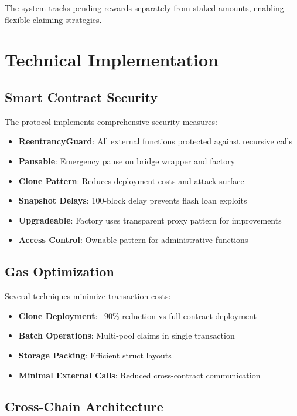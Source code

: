 \documentclass{article}
\begin{document}
The system tracks pending rewards separately from staked amounts, enabling flexible claiming strategies.

\section{Technical Implementation}

\subsection{Smart Contract Security}

The protocol implements comprehensive security measures:

\begin{itemize}
    \item \textbf{ReentrancyGuard}: All external functions protected against recursive calls
    \item \textbf{Pausable}: Emergency pause on bridge wrapper and factory
    \item \textbf{Clone Pattern}: Reduces deployment costs and attack surface
    \item \textbf{Snapshot Delays}: 100-block delay prevents flash loan exploits
    \item \textbf{Upgradeable}: Factory uses transparent proxy pattern for improvements
    \item \textbf{Access Control}: Ownable pattern for administrative functions
\end{itemize}

\subsection{Gas Optimization}

Several techniques minimize transaction costs:

\begin{itemize}
    \item \textbf{Clone Deployment}: ~90\% reduction vs full contract deployment
    \item \textbf{Batch Operations}: Multi-pool claims in single transaction
    \item \textbf{Storage Packing}: Efficient struct layouts
    \item \textbf{Minimal External Calls}: Reduced cross-contract communication
\end{itemize}

\subsection{Cross-Chain Architecture}
\end{document}
